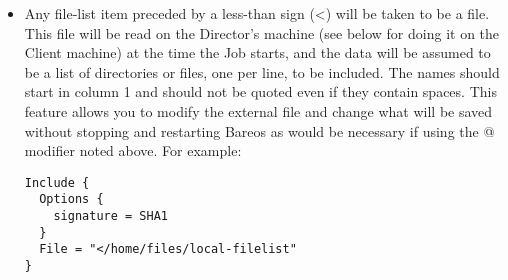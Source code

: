 \begin{description}
\begin{itemize}
   If the vertical bar (\verb+|+) in front of  is preceded by a
   backslash as in \textbackslash{}\verb+|+, the program will be executed on the
   Client's machine instead of on the Director's machine.
   Please note that if the filename is given within quotes, you
   will need to use two slashes.  An example, provided by John Donagher,
   that backs up all the local UFS partitions on a remote system is:

\begin{bconfig}{File Set with inline script in quotes}
FileSet {
  Name = "All local partitions"
  Include {
    Options {
      signature=SHA1
      onefs=yes
    }
    File = "\\|bash -c \"df -klF ufs | tail +2 | awk '{print \$6}'\""
  }
}
\end{bconfig}

   The above requires two backslash characters after the double quote (one
   preserves  the next one). If you are a Linux user, just change the {\bf ufs}
   to  {\bf ext3} (or your preferred filesystem type), and you will be in
   business.

   If you know what filesystems you have mounted on your system, e.g.
   for Linux only using ext2, ext3 or ext4, you can backup
   all local filesystems using something like:

\begin{bconfig}{File Set to backup all extfs partions}
Include {
   Options {
     signature = SHA1
     onfs=no
     fstype=ext2
   }
   File = /
}
\end{bconfig}

\item Any file-list item preceded by a less-than sign ({\textless})  will be taken
   to be a file. This file will be read on the Director's machine (see
   below for doing it on the Client machine) at the time
   the Job starts, and the  data will be assumed to be a list of directories or
   files,  one per line, to be included. The names should start in  column 1 and
   should not be quoted even if they contain  spaces. This feature allows you to
   modify the external  file and change what will be saved without stopping and
   restarting Bareos as would be necessary if using the @  modifier noted above.
   For example:

\footnotesize
\begin{verbatim}
Include {
  Options {
    signature = SHA1
  }
  File = "</home/files/local-filelist"
}
\end{verbatim}
\normalsize


\end{itemize}
\end{description}

